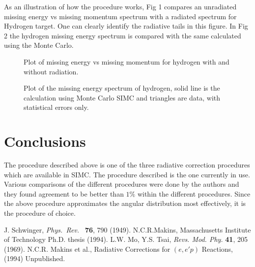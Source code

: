 As an illustration of how the procedure works, Fig 1 compares an unradiated
missing energy vs missing momentum spectrum with a radiated spectrum for 
Hydrogen target. One can clearly identify  the radiative tails in this figure. 
In Fig 2 the hydrogen missing energy spectrum is compared with the same 
calculated using the Monte Carlo.

\begin{figure}  
\vspace{10pt}
\caption{Plot of missing energy vs missing momentum for hydrogen with and without radiation.}
\end{figure}




\begin{figure}  
\vspace{10pt}
\caption{Plot of the missing energy spectrum of hydrogen, solid line is the calculation using Monte Carlo SIMC and triangles are data, with statistical errors only.}
\end{figure}


\section*{Conclusions}
The procedure described above is one of the three radiative correction 
procedures which are available in SIMC. The procedure described is the 
one currently in use. Various comparisons of the different procedures were
done by the authors and they found agreement to be better than $1\%$ within the different procedures. Since the above procedure approximates the angular distribution most effectively, it is the procedure of choice. 


\begin{references}
J. Schwinger, {\it Phys.\ Rev.\ } {\bf 76}, 790 (1949). 
N.C.R.Makins, Massachusetts Institute of Technology Ph.D. thesis (1994).
L.W. Mo, Y.S. Tsai, {\it Revs. Mod. Phy.} {\bf 41}, 205 (1969).
N.C.R. Makins et al., Radiative Corrections for $(e,e'p)$ Reactions, (1994) Unpublished.
\end{references}   








